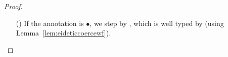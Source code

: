 \documentclass[9pt]{extarticle}
\newcommand{\ottnt}[1]{\mathit{#1}}
\begin{document}
\begin{lemma}
\begin{proof}
{\begin{itemize}
\begin{itemize}
      \item[(\E{Beta})] We know that $  \mathit{x} \mathord{:} \ottnt{T_{{\mathrm{1}}}}    \vdash _{  \mathsf{E}  }  \ottnt{e_{{\mathrm{1}}}}  :  \ottnt{T_{{\mathrm{2}}}} $ and
        $ \emptyset   \vdash _{  \mathsf{E}  }  \ottnt{e_{{\mathrm{2}}}}  :  \ottnt{T_{{\mathrm{1}}}} $; we are done by substitution
        (Lemma~\ref{lem:substitution}).
      \item[(\E{Unwrap})] We have $\ottnt{e} =
          (  \langle   \ottnt{T_{{\mathrm{11}}}} \mathord{ \rightarrow } \ottnt{T_{{\mathrm{12}}}}   \mathord{ \overset{ \ottnt{c_{{\mathrm{1}}}}  \mapsto  \ottnt{c_{{\mathrm{2}}}} }{\Rightarrow} }   \ottnt{T_{{\mathrm{21}}}} \mathord{ \rightarrow } \ottnt{T_{{\mathrm{22}}}}   \rangle^{\bullet} ~  \ottnt{e_{{\mathrm{1}}}}  )  ~ \ottnt{e_{{\mathrm{2}}}}  \,  \longrightarrow _{  \mathsf{E}  }  \,  \langle  \ottnt{T_{{\mathrm{12}}}}  \mathord{ \overset{ \ottnt{c_{{\mathrm{2}}}} }{\Rightarrow} }  \ottnt{T_{{\mathrm{22}}}}  \rangle^{\bullet} ~   (  \ottnt{e_{{\mathrm{1}}}} ~  (  \langle  \ottnt{T_{{\mathrm{21}}}}  \mathord{ \overset{ \ottnt{c_{{\mathrm{1}}}} }{\Rightarrow} }  \ottnt{T_{{\mathrm{11}}}}  \rangle^{\bullet} ~  \ottnt{e_{{\mathrm{2}}}}  )   )   = \ottnt{e'}$.

        By inversion, $ \mathord{  \vdash _{  \mathsf{E}  } }~ \ottnt{c_{{\mathrm{1}}}}   \mathrel{\parallel}   \ottnt{T_{{\mathrm{21}}}}  \Rightarrow  \ottnt{T_{{\mathrm{11}}}} $ and $ \mathord{  \vdash _{  \mathsf{E}  } }~ \ottnt{c_{{\mathrm{2}}}}   \mathrel{\parallel}   \ottnt{T_{{\mathrm{12}}}}  \Rightarrow  \ottnt{T_{{\mathrm{22}}}} $. We are done by  and .
      \item[(\E{AppL})] By  and the IH.
      \item[(\E{AppR})] By  and the IH.
      \item[(\E{AppRaiseL})] By regularity, $ \mathord{  \vdash _{  \mathsf{E}  } }~ \ottnt{T_{{\mathrm{2}}}} $, so we are
        done by .
      \item[(\E{AppRaiseR})] By regularity, $ \mathord{  \vdash _{  \mathsf{E}  } }~ \ottnt{T_{{\mathrm{2}}}} $, so we are
        done by .
      \end{itemize}
    \item[(\T{Cast})] If the annotation is $ \bullet $, we step by
      , which is well typed by  (using
      Lemma~\ref{lem:eideticcoercewf}).


\end{itemize}}
\end{proof}
\end{lemma}
\end{document}
